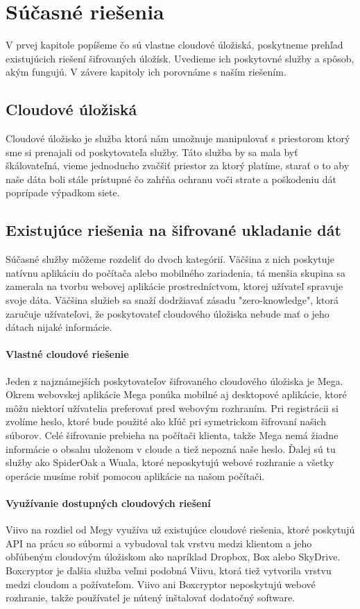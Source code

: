 \chapter{Súčasné riešenia}

V prvej kapitole popíšeme čo sú vlastne cloudové úložiská, poskytneme prehľad existujúcich riešení šifrovaných úložísk. Uvedieme ich poskytovné služby a spôsob, akým fungujú. V závere kapitoly ich porovnáme s naším riešením.

\section{Cloudové úložiská}
	Cloudové úložisko je služba ktorá nám umožnuje manipulovať s priestorom ktorý sme si prenajali od poskytovateľa služby. Táto služba by sa mala byť škálovateľná, vieme jednoducho zvačšiť priestor za ktorý platíme, starať o to aby naše dáta boli stále prístupné čo zahŕňa ochranu voči strate a poškodeniu dát poprípade výpadkom siete. 
	
\section{Existujúce riešenia na šifrované ukladanie dát}
	Súčasné služby môžeme rozdeliť do dvoch kategórií. Väčšina z nich poskytuje natívnu aplikáciu do počítača alebo mobilného zariadenia, tá menšia skupina sa zamerala na tvorbu webovej aplikácie prostredníctvom, ktorej užívateľ spravuje svoje dáta. Väčšina služieb sa snaží dodržiavať zásadu "zero-knowledge", ktorá zaručuje užívateľovi, že poskytovateľ cloudového úložiska nebude mať o jeho dátach nijaké informácie. 
	\subsubsection{Vlastné cloudové riešenie}
		Jeden z najznámejších poskytovateľov šifrovaného cloudového úložiska je Mega. Okrem webovskej aplikácie Mega ponúka mobilné aj desktopové aplikácie, ktoré môžu niektorí užívatelia preferovať pred webovým rozhraním. Pri registrácii si zvolíme heslo, ktoré bude použité ako kľúč pri symetrickom šifrovaní našich súborov. Celé šifrovanie prebieha na počítači klienta, takže Mega nemá žiadne informácie o obsahu uloženom v cloude a tiež nepozná naše heslo. Ďalej sú tu služby ako SpiderOak a Wuala, ktoré neposkytujú webové rozhranie a všetky operácie musíme robiť pomocou aplikácie na našom počítači.
	\subsubsection{Využívanie dostupných cloudových riešení}
		Viivo na rozdiel od Megy využíva už existujúce cloudové riešenia, ktoré poskytujú API na prácu so súbormi a vybudoval tak vrstvu medzi klientom a jeho obľúbeným cloudovým úložiskom ako napríklad Dropbox, Box alebo SkyDrive. Boxcryptor je ďalšia služba veľmi podobná Viivu, ktorá tiež vytvorila vrstvu medzi cloudom a požívateľom. Viivo ani Boxcryptor neposkytujú webové rozhranie, takže používatel je nútený inštalovať dodatočný software. 

